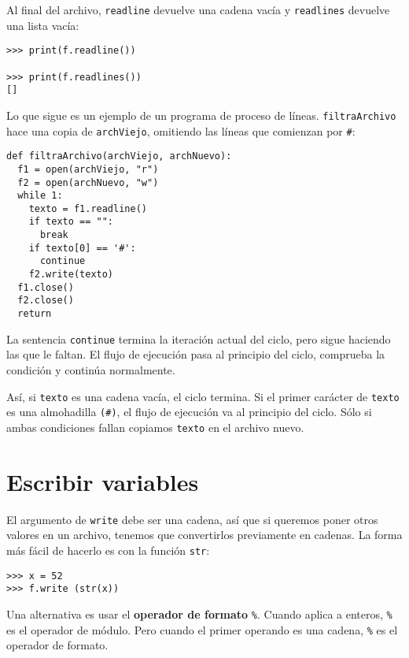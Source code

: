 Al final del archivo, \texttt{readline} devuelve una cadena vacía
y \texttt{readlines} devuelve una lista vacía:
\begin{lstlisting}
>>> print(f.readline())

>>> print(f.readlines())
[]
\end{lstlisting}
Lo que sigue es un ejemplo de un programa de proceso de líneas. \texttt{filtraArchivo}
hace una copia de \texttt{archViejo}, omitiendo las líneas que comienzan
por \texttt{\#}:
\begin{lstlisting}
def filtraArchivo(archViejo, archNuevo):
  f1 = open(archViejo, "r")
  f2 = open(archNuevo, "w")
  while 1:
    texto = f1.readline()
    if texto == "":
      break
    if texto[0] == '#':
      continue
    f2.write(texto)
  f1.close()
  f2.close()
  return
\end{lstlisting}
La sentencia \texttt{continue} termina la iteración actual del ciclo,
pero sigue haciendo las que le faltan. El flujo de ejecución pasa
al principio del ciclo, comprueba la condición y continúa normalmente.

 

Así, si \texttt{texto} es una cadena vacía, el ciclo termina. Si el
primer carácter de \texttt{texto} es una almohadilla \texttt{(\#)},
el flujo de ejecución va al principio del ciclo. Sólo si ambas condiciones
fallan copiamos \texttt{texto} en el archivo nuevo.

\section{Escribir variables}

  

El argumento de \texttt{write} debe ser una cadena, así que si queremos
poner otros valores en un archivo, tenemos que convertirlos previamente
en cadenas. La forma más fácil de hacerlo es con la función \texttt{str}:
\begin{lstlisting}
>>> x = 52
>>> f.write (str(x))
\end{lstlisting}
Una alternativa es usar el \textbf{operador de formato} \texttt{\%}.
Cuando aplica a enteros, \texttt{\%} es el operador de módulo. Pero
cuando el primer operando es una cadena, \texttt{\%} es el operador
de formato.

